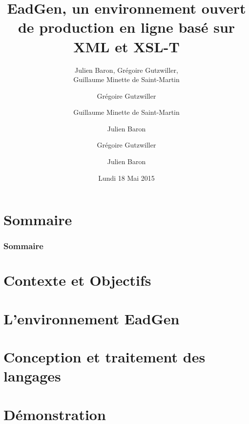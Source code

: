 \documentclass[11pt, handout]{beamer}
\title[EadGen]{EadGen, un environnement ouvert de production en ligne basé sur 
XML et XSL-T}
\author{Julien Baron, Grégoire Gutzwiller, \\ Guillaume Minette de Saint-Martin}
\date[18/05/2015]{Lundi 18 Mai 2015}
\begin{document}
\begin{frame}[plain]
	\maketitle
\end{frame}

\author{Grégoire Gutzwiller}
\section*{Sommaire}
\begin{frame}
	\frametitle{Sommaire}
	\tableofcontents
\end{frame}

\author{Guillaume Minette de Saint-Martin}
\section{Contexte et Objectifs}


\author{Julien Baron}
\section{L'environnement EadGen}


\author{Grégoire Gutzwiller}
\section{Conception et traitement des langages}


\author{Julien Baron}
\section{Démonstration}

\end{document}
